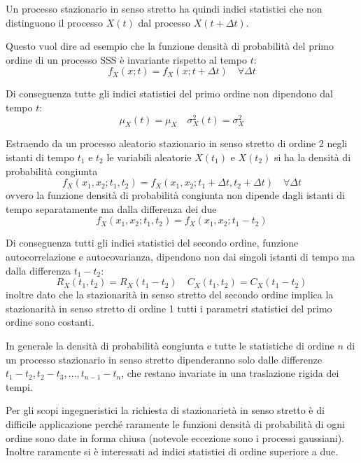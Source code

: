 Un processo stazionario in senso stretto ha quindi indici statistici che non distinguono il processo $X(t)$ dal processo $X(t+\Delta t)$.

Questo vuol dire ad esempio che la funzione densità di probabilità del primo ordine di un processo SSS è invariante rispetto al tempo $t$:
\[
	f_X(x;t)=f_X(x;t+\Delta t)\quad\forall\Delta t
\]

Di conseguenza tutte gli indici statistici del primo ordine non dipendono dal tempo $t$:
\[
	\mu_X(t)=\mu_X\quad \sigma^2_X(t)=\sigma^2_X
\]

Estraendo da un processo aleatorio stazionario in senso stretto di ordine 2 negli istanti di tempo $t_1$ e $t_2$ le variabili aleatorie $X(t_1)$ e $X(t_2)$ si ha la densità di probabilità congiunta
\[
	f_X(x_1,x_2;t_1,t_2)=f_X(x_1,x_2;t_1+\Delta t,t_2+\Delta t)\quad\forall\Delta t
\]
ovvero la funzione densità di probabilità congiunta non dipende dagli istanti di tempo separatamente ma dalla differenza dei due
\begin{equation}
	f_X(x_1,x_2;t_1,t_2)=f_X(x_1,x_2;t_1-t_2)
\end{equation}

Di conseguenza tutti gli indici statistici del secondo ordine, funzione autocorrelazione e autocovarianza, dipendono non dai singoli istanti di tempo ma dalla differenza $t_1-t_2$:
\[
	R_X(t_1,t_2)=R_X(t_1-t_2)\quad C_X(t_1,t_2)=C_X(t_1-t_2)
\]
inoltre dato che la stazionarità in senso stretto del secondo ordine implica la stazionarità in senso stretto di ordine 1 tutti i parametri statistici del primo ordine sono costanti.

In generale la densità di probabilità congiunta e tutte le statistiche di ordine $n$ di un processo stazionario in senso stretto dipenderanno solo dalle differenze $t_1-t_2, t_2-t_3, \dots, t_{n-1}-t_n$, che restano invariate in una traslazione rigida dei tempi.

\begin{nota}
	Per gli scopi ingegneristici la richiesta di stazionarietà in senso stretto è di difficile applicazione perché raramente le funzioni densità di probabilità di ogni ordine sono date in forma chiusa (notevole eccezione sono i processi gaussiani). Inoltre raramente si è interessati ad indici statistici di ordine superiore a due.
\end{nota}

